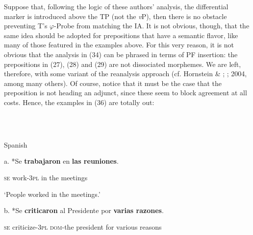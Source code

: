 \documentclass[output=paper]{langsci/langscibook}
\begin{document}
\begin{styleHTMLPreformatted}
Suppose that, following the logic of these authors’ analysis, the differential marker is introduced above the TP (not the \textit{v}P), then there is no obstacle preventing T’s $\varphi ${}-Probe from matching the IA. It is not obvious, though, that the same idea should be adopted for prepositions that have a semantic flavor, like many of those featured in the examples above. For this very reason, it is not obvious that the analysis in (34) can be phrased in terms of PF insertion: the prepositions in (27), (28) and (29) are not dissociated morphemes. We are left, therefore, with some variant of the reanalysis approach (cf. Hornstein \& \citealt{Weinberg1981}; \citealt{Kayne1975}; 2004, among many others). Of course, notice that it must be the case that the preposition is not heading an adjunct, since these seem to block agreement at all costs. Hence, the examples in (36) are totally out:
\end{styleHTMLPreformatted}

\begin{styleHTMLPreformatted}
\ea%
    \label{ex:key:36}
    \gll\\
        \\
    \glt
    \z

          Spanish
\end{styleHTMLPreformatted}

\begin{styleHTMLPreformatted}
a. *Se  \textbf{trabajaron}  en  \textbf{las reuniones}.   
\end{styleHTMLPreformatted}

\begin{styleHTMLPreformatted}
        \textsc{se}   work-\textsc{3pl}     in  the meetings
\end{styleHTMLPreformatted}

\begin{styleHTMLPreformatted}
        ‘People worked in the meetings.’
\end{styleHTMLPreformatted}

\begin{styleHTMLPreformatted}
  b. *Se   \textbf{criticaron}     al              Presidente  por \textbf{varias razones}.
\end{styleHTMLPreformatted}

\begin{styleHTMLPreformatted}
        \textsc{se}   criticize-\textsc{3pl} \textsc{dom}{}-the president      for various reasons
\end{styleHTMLPreformatted}
\end{document}
